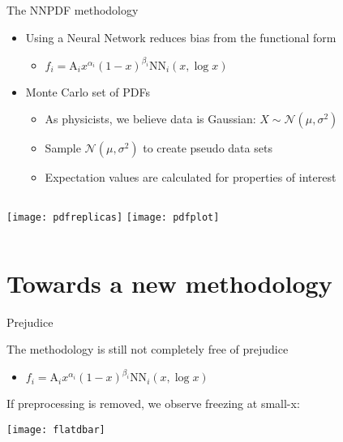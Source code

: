 \begin{frame}{The NNPDF methodology}

\vspace*{\titleskip}

\begin{itemize}
\item Using a Neural Network reduces bias from the functional form
\begin{itemize}
\item $f_i=\text{A}_ix^{\alpha_i}(1-x)^{\beta_i}\text{NN}_i(x,\log x)$
\end{itemize}
\item Monte Carlo set of PDFs
\begin{itemize}
\item As physicists, we believe data is Gaussian: $X\sim \mathcal{N}(\mu, \sigma^2)$
\item Sample $\mathcal{N}(\mu, \sigma^2)$ to create pseudo data sets
\item Expectation values are calculated for properties of interest
\end{itemize}
\end{itemize}

\vspace*{\secondskip}

\begin{columns}[T,onlytextwidth]
	\texttt{[image: pdfreplicas]}
	\texttt{[image: pdfplot]}
\end{columns}

\end{frame}


\section{Towards a new methodology}


\begin{frame}{Prejudice}

\vspace*{\titleskip}
The methodology is still not completely free of prejudice 
\begin{itemize}
\item $f_i=\text{A}_ix^{\alpha_i}(1-x)^{\beta_i}\text{NN}_i(x,\log x)$
\end{itemize}

If preprocessing is removed, we observe freezing at small-x:
\vspace*{\secondskip}

\begin{center}
\texttt{[image: flatdbar]}
\end{center}

\end{frame}

